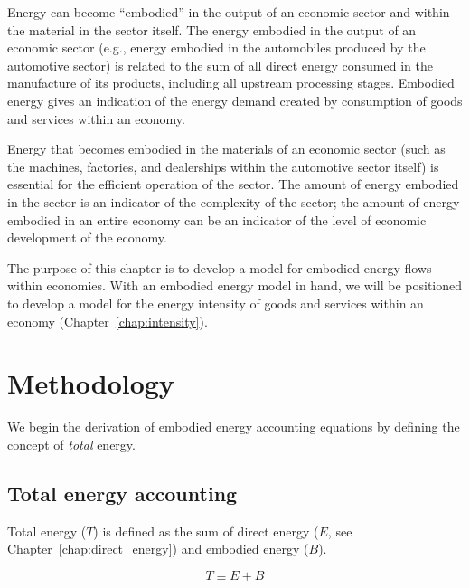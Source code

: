 Energy can become ``embodied'' in the output of an economic sector
and within the material in the sector itself.
The energy embodied in the output of an economic sector 
(e.g., energy embodied in the automobiles produced by the automotive sector)
is related to the sum of all direct energy
consumed in the manufacture of its products, 
including all upstream processing stages. 
Embodied energy gives an indication 
of the energy demand created by consumption of goods and services
within an economy.

Energy that becomes embodied in the materials of an economic sector 
(such as the machines, factories, and dealerships 
within the automotive sector itself) is essential for 
the efficient operation of the sector. The amount of energy
embodied in the sector is an indicator of the complexity of
the sector; the amount of energy embodied in an entire economy
can be an indicator of the level of 
economic development
of the economy.

The purpose of this chapter is to develop a model for 
embodied energy flows within economies. 
With an embodied energy model in hand, we will be positioned
to develop a model for the energy intensity 
of goods and services within an economy 
(Chapter~\ref{chap:intensity}).


\section{Methodology}
\label{sec:embodied_methodology}

We begin the derivation of embodied energy accounting
equations by defining the concept of 
\emph{total} energy. 


\subsection{Total energy accounting}
\label{sec:total_energy_accounting}

Total energy ($T$)
is defined as the sum of 
direct energy 
($E$, see Chapter~\ref{chap:direct_energy}) 
and embodied energy ($B$).

\begin{equation} \label{eq:T_def}
	T \equiv E + B
\end{equation}

